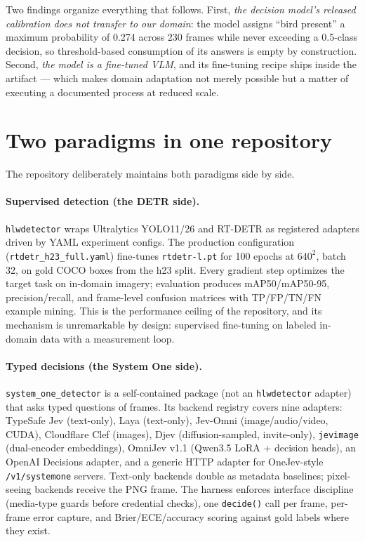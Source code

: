 \documentclass[11pt]{article}
\newcommand{\code}[1]{\texttt{#1}}
\newcommand{\pkg}[1]{\texttt{#1}}
\newcommand{\sone}{System One}
\begin{document}
Two findings organize everything that follows. First, \emph{the decision
model's released calibration does not transfer to our domain}: the model
assigns ``bird present'' a maximum probability of 0.274 across 230 frames
while never exceeding a 0.5-class decision, so threshold-based consumption of
its answers is empty by construction. Second, \emph{the model is a fine-tuned
VLM}, and its fine-tuning recipe ships inside the artifact --- which makes
domain adaptation not merely possible but a matter of executing a documented
process at reduced scale.

\section{Two paradigms in one repository}
\label{sec:paradigms}

The repository deliberately maintains both paradigms side by side.

\paragraph{Supervised detection (the DETR side).}
\pkg{hlwdetector} wraps Ultralytics YOLO11/26 and RT-DETR as registered
adapters driven by YAML experiment configs. The production configuration
(\code{rtdetr\_h23\_full.yaml}) fine-tunes \code{rtdetr-l.pt} for 100 epochs
at $640^2$, batch 32, on gold COCO boxes from the h23 split. Every gradient
step optimizes the target task on in-domain imagery; evaluation produces
mAP50/mAP50-95, precision/recall, and frame-level confusion matrices with
TP/FP/TN/FN example mining. This is the performance ceiling of the
repository, and its mechanism is unremarkable by design: supervised
fine-tuning on labeled in-domain data with a measurement loop.

\paragraph{Typed decisions (the \sone{} side).}
\pkg{system\_one\_detector} is a self-contained package (not an
\pkg{hlwdetector} adapter) that asks typed questions of frames. Its backend
registry covers nine adapters: TypeSafe Jev (text-only), Laya (text-only),
Jev-Omni (image/audio/video, CUDA), Cloudflare Clef (images), Djev
(diffusion-sampled, invite-only), \code{jevimage} (dual-encoder embeddings),
OmniJev v1.1 (Qwen3.5 LoRA + decision heads), an OpenAI Decisions adapter, and
a generic HTTP adapter for OneJev-style \code{/v1/systemone} servers. Text-only
backends double as metadata baselines; pixel-seeing backends receive the PNG
frame. The harness enforces interface discipline (media-type guards before
credential checks), one \code{decide()} call per frame, per-frame error
capture, and Brier/ECE/accuracy scoring against gold labels where they exist.
\end{document}
